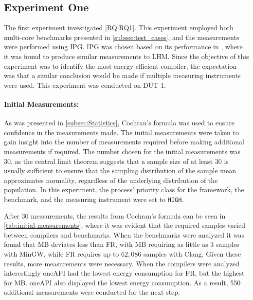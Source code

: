 \subsection{Experiment One}\label{subsec:exp_one}

The first experiment investigated \cref{RQ:RQ1}. This experiment employed both multi-core benchmarks presented in \cref{subsec:test_cases}, and the measurements were performed using IPG. IPG was chosen based on its performance in \cite{biksbois}, where it was found to produce similar measurements to LHM. Since the objective of this experiment was to identify the most energy-efficient compiler, the expectation was that a similar conclusion would be made if multiple measuring instruments were used. This experiment was conducted on DUT 1.  

\paragraph{Initial Measurements:} As was presented in \cref{subsec:Statistics}, Cochran's formula was used to ensure confidence in the measurements made. The initial measurements were taken to gain insight into the number of measurements required before making additional measurements if required. The number chosen for the initial measurements was 30, as the central limit theorem suggests that a sample size of at least 30 is usually sufficient to ensure that the sampling distribution of the sample mean approximates normality, regardless of the underlying distribution of the population\cite{central-limit-theorem}. In this experiment, the process' priority class for the framework, the benchmark, and the measuring instrument were set to \texttt{HIGH}.

After 30 measurements, the results from Cochran's formula can be seen in \cref{tab:initial-measurements}, where it was evident that the required samples varied between compilers and benchmarks. When the benchmarks were analyzed it was found that MB deviates less than FR, with MB requiring as little as $3$ samples with MinGW, while FR requires up to $62,086$ samples with Clang. Given these results, more measurements were necessary. When the compilers were analyzed interestingly oneAPI had the lowest energy consumption for FR, but the highest for MB. oneAPI also displayed the lowest energy consumption. As a result, 550 additional measurements were conducted for the next step.



